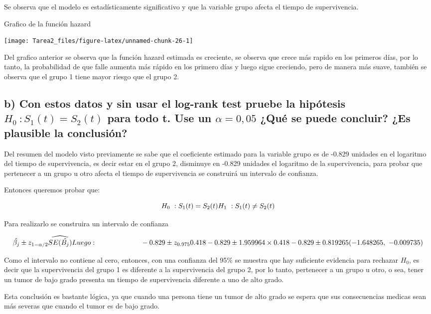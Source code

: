 \documentclass[
]{article}
\begin{document}
Se observa que el modelo es estadísticamente significativo y que la
variable grupo afecta el tiempo de supervivencia.

Grafico de la función hazard

\begin{center}\texttt{[image: Tarea2\_files/figure-latex/unnamed-chunk-26-1]} \end{center}

Del grafico anterior se observa que la función hazard estimada es
creciente, se observa que crece más rapido en los primeros días, por lo
tanto, la probabilidad de que falle aumenta más rápido en los primero
días y luego sigue creciendo, pero de manera más suave, también se
observa que el grupo 1 tiene mayor riesgo que el grupo 2.

\subsection{b) Con estos datos y sin usar el log-rank test pruebe la hipótesis $H_0~:S_1(t) = S_2(t)$ para todo t. Use un $\alpha = 0,05$ ¿Qué se puede concluir? ¿Es plausible la conclusión?}

Del resumen del modelo visto previamente se sabe que el coeficiente
estimado para la variable grupo es de -0.829 unidades en el logaritmo
del tiempo de supervivencia, es decir estar en el grupo 2, disminuye en
-0.829 unidades el logaritmo de la supervivencia, para probar que
pertenecer a un grupo u otro afecta el tiempo de supervivencia se
construirá un intervalo de confianza.

Entonces queremos probar que:

\[H_0~:S_1(t) = S_2(t) \\ H_1~:S_1(t) \neq S_2(t)\]

Para realizarlo se construira un intervalo de confianza

\[\hat{\beta_j} \pm z_{1 - \alpha/2} \widehat{SE(\hat{B_j})} \\ 
Luego: ~~~~~~~~~~~~~~~~~~~~ \\
-0.829 \pm z_{0.975}0.418 \\
-0.829 \pm 1.959964\times0.418 \\ 
-0.829 \pm 0.819265 \\
(-1.648265,~-0.009735)\]

Como el intervalo no contiene al cero, entonces, con una confianza del
95\% se muestra que hay suficiente evidencia para rechazar \(H_0\), es
decir que la supervivencia del grupo 1 es diferente a la supervivencia
del grupo 2, por lo tanto, pertenecer a un grupo u otro, o sea, tener un
tumor de bajo grado presenta un tiempo de supervivencia diferente a uno
de alto grado.

Esta conclusión es bastante lógica, ya que cuando una persona tiene un
tumor de alto grado se espera que sus consecuencias medicas sean más
severas que cuando el tumor es de bajo grado.
\end{document}
